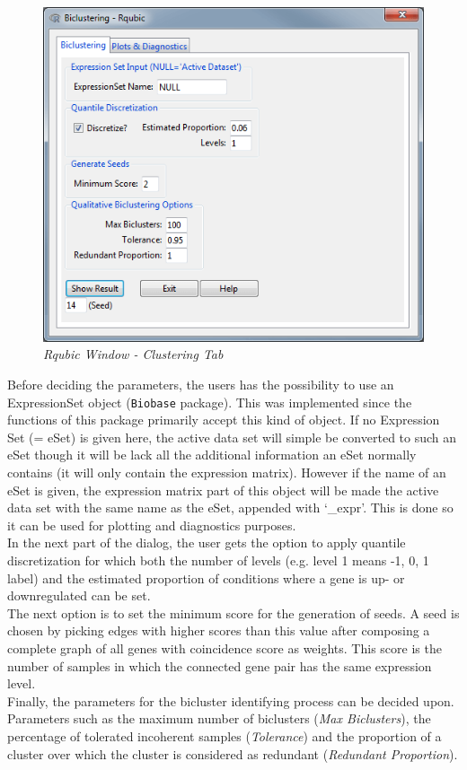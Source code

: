 \documentclass[a4paper]{article}\usepackage[]{graphicx}\usepackage[]{color}
\begin{document}
\begin{figure}[H]
\centering
\includegraphics[scale=0.5]{figures/rqubic_clusttab.png}
\caption{{\it Rqubic Window - Clustering Tab}\label{rqubic_clusttab}}
\end{figure}
\noindent Before deciding the parameters, the users has the possibility to use
an ExpressionSet object (\verb|Biobase| package). This was implemented since the
functions of this package primarily accept this kind of object. If no Expression
Set (= eSet) is given here, the active data set will simple be converted to such an
eSet though it will be lack all the additional information an eSet normally
contains (it will only contain the expression matrix). However if the name of an
eSet is given, the expression matrix part of this object will be made the active
data set with the same name as the eSet, appended with `\_expr'. This is done so
it can be used for plotting and diagnostics purposes.\\
In the next part of the dialog, the user gets the option to apply quantile
discretization for which both the number of levels (e.g. level 1 means -1,
0, 1 label) and the estimated proportion of conditions where a gene is up- or
downregulated can be set.\\
The next option is to set the minimum score for the generation of seeds.
A seed is chosen by picking edges with higher scores than this value after composing a complete graph of all genes with coincidence score as weights. This score is the number of samples in which the connected gene pair has the same expression level.\\
Finally, the parameters for the bicluster identifying process can be decided
upon. Parameters such as the maximum number of biclusters ({\it Max Biclusters}), the percentage of
tolerated incoherent samples ({\it Tolerance}) and the proportion of a cluster over which the
cluster is considered as redundant ({\it Redundant Proportion}).
\end{document}
